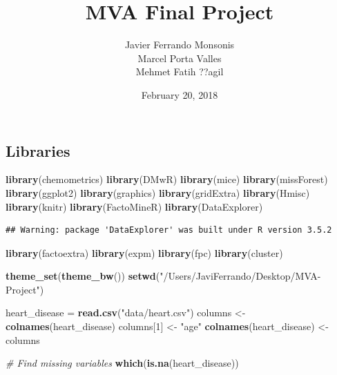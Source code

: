 \documentclass[]{article}
\title{MVA Final Project}
\author{Javier Ferrando Monsonis \\ Marcel Porta Valles \\ Mehmet Fatih ??agil}
\date{February 20, 2018}
\newenvironment{Shaded}{\begin{snugshade}}{\end{snugshade}}
\newcommand{\KeywordTok}[1]{\textcolor[rgb]{0.13,0.29,0.53}{\textbf{#1}}}
\newcommand{\DecValTok}[1]{\textcolor[rgb]{0.00,0.00,0.81}{#1}}
\newcommand{\StringTok}[1]{\textcolor[rgb]{0.31,0.60,0.02}{#1}}
\newcommand{\CommentTok}[1]{\textcolor[rgb]{0.56,0.35,0.01}{\textit{#1}}}
\newcommand{\NormalTok}[1]{#1}
\begin{document}
\maketitle

\subsection{Libraries}\label{libraries}

\begin{Shaded}
\begin{Highlighting}[]
\KeywordTok{library}\NormalTok{(chemometrics)}
\KeywordTok{library}\NormalTok{(DMwR)}
\KeywordTok{library}\NormalTok{(mice)}
\KeywordTok{library}\NormalTok{(missForest)}
\KeywordTok{library}\NormalTok{(ggplot2)}
\KeywordTok{library}\NormalTok{(graphics)}
\KeywordTok{library}\NormalTok{(gridExtra)}
\KeywordTok{library}\NormalTok{(Hmisc)}
\KeywordTok{library}\NormalTok{(knitr)}
\KeywordTok{library}\NormalTok{(FactoMineR)}
\KeywordTok{library}\NormalTok{(DataExplorer)}
\end{Highlighting}
\end{Shaded}

\begin{verbatim}
## Warning: package 'DataExplorer' was built under R version 3.5.2
\end{verbatim}

\begin{Shaded}
\begin{Highlighting}[]
\KeywordTok{library}\NormalTok{(factoextra)}
\KeywordTok{library}\NormalTok{(expm)}
\KeywordTok{library}\NormalTok{(fpc)}
\KeywordTok{library}\NormalTok{(cluster)}

\KeywordTok{theme_set}\NormalTok{(}\KeywordTok{theme_bw}\NormalTok{())}
\KeywordTok{setwd}\NormalTok{(}\StringTok{"/Users/JaviFerrando/Desktop/MVA-Project"}\NormalTok{)}
\end{Highlighting}
\end{Shaded}

\begin{Shaded}
\begin{Highlighting}[]
\NormalTok{heart_disease =}\StringTok{ }\KeywordTok{read.csv}\NormalTok{(}\StringTok{"data/heart.csv"}\NormalTok{)}
\NormalTok{columns <-}\StringTok{ }\KeywordTok{colnames}\NormalTok{(heart_disease)}
\NormalTok{columns[}\DecValTok{1}\NormalTok{] <-}\StringTok{ "age"}
\KeywordTok{colnames}\NormalTok{(heart_disease) <-}\StringTok{ }\NormalTok{columns}

\CommentTok{# Find missing variables}
\KeywordTok{which}\NormalTok{(}\KeywordTok{is.na}\NormalTok{(heart_disease))}
\end{Highlighting}
\end{Shaded}
\end{document}
